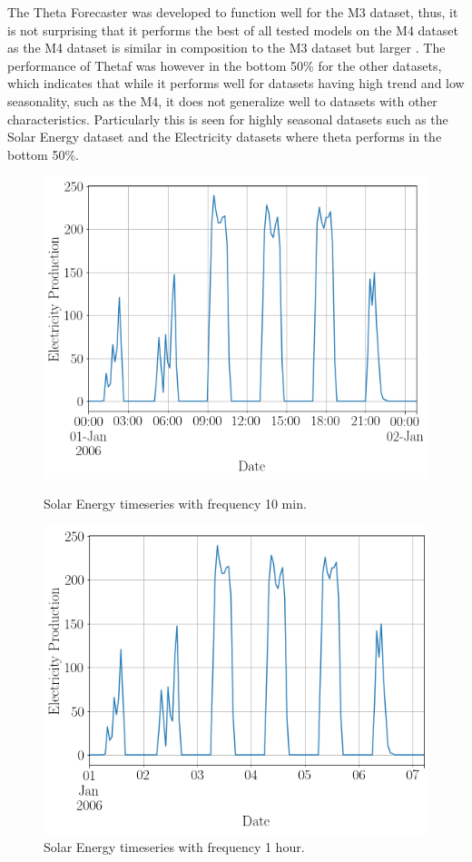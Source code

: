 The Theta Forecaster was developed to function well for the M3 dataset, thus, it is not surprising that it performs the best of all tested models on the M4 dataset as the M4 dataset is similar in composition to the M3 dataset but larger \cite{m3_vs_M4}. The performance of Thetaf was however in the bottom 50\% for the other datasets, which indicates that while it performs well for datasets having high trend and low seasonality, such as the M4,  it does not generalize well to datasets with other characteristics. Particularly this is seen for highly seasonal datasets such as the Solar Energy dataset and the Electricity datasets where theta performs in the bottom 50\%.

\begin{figure}[htb]
  \centering
  \includegraphics[width=\linewidth]{./img/solar_energy_10min_small.png}
  \caption{Solar Energy timeseries with frequency 10 min.}
  \label{fig:solar_10_min}
  \endminipage\hfill
  \includegraphics[width=\linewidth]{./img/solar_energy_fixed_small.png}
  \caption{Solar Energy timeseries with frequency 1 hour.}
  \label{fig:solar_fixed}
  \endminipage\hfill
\end{figure}

